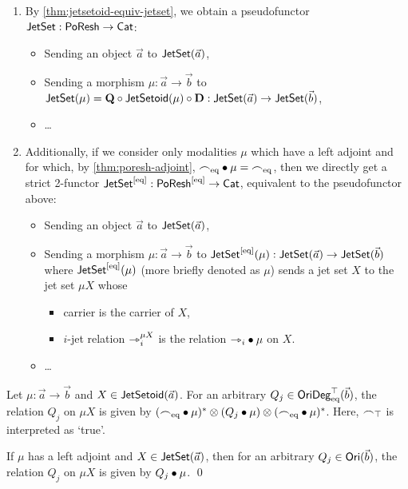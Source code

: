 \documentclass[a4paper]{memoir}
\begin{document}
\begin{definition}
\begin{enumerate}
		\item By \cref{thm:jetsetoid-equiv-jetset}, we obtain a pseudofunctor $\mathsf{JetSet} : \mathsf{PoResh} \to {\mathsf{Cat}}$:
		\begin{itemize}
			\item Sending an object $\vec a$ to $\mathsf{JetSet}(\vec a)$,
			\item Sending a morphism $\mu : \vec a \to \vec b$ to $\mathsf{JetSet}(\mu) = {\mathbf{Q}} \circ \mathsf{JetSetoid}(\mu) \circ {\mathbf{D}} : \mathsf{JetSet}(\vec a) \to \mathsf{JetSet}(\vec b)$,
			\item \ldots
		\end{itemize}
		
		\item Additionally, if we consider only modalities $\mu$ which have a left adjoint and for which, by \cref{thm:poresh-adjoint}, ${\frown}_{{\mathrm{eq}}} \mathbin{\bullet} \mu = {\frown}_{{\mathrm{eq}}}$, then we directly get a strict 2-functor $\mathsf{JetSet} ^{[{\mathrm{eq}}]} : \mathsf{PoResh} ^{[{\mathrm{eq}}]} \to {\mathsf{Cat}}$, equivalent to the pseudofunctor above:
		\begin{itemize}
			\item Sending an object $\vec a$ to $\mathsf{JetSet}(\vec a)$,
			\item Sending a morphism $\mu : \vec a \to \vec b$ to $\mathsf{JetSet}^{[{\mathrm{eq}}]}(\mu) : \mathsf{JetSet}(\vec a) \to \mathsf{JetSet}(\vec b)$ where $\mathsf{JetSet}^{[{\mathrm{eq}}]}(\mu)$ (more briefly denoted as $\mu$) sends a jet set $X$ to the jet set $\mu X$ whose
			\begin{itemize}
				\item carrier is the carrier of $X$,
				\item $i$-jet relation ${\rightarrowtriangle}_i^{\mu X}$ is the relation ${\rightarrowtriangle}_i \mathbin{\bullet} \mu$ on $X$.
			\end{itemize}
			\item \ldots
		\end{itemize}
	\end{enumerate}
\end{definition}
\begin{corollary} \label{thm:poresh-jetsetoid:bind}
	Let $\mu : \vec a \to \vec b$ and $X \in \mathsf{JetSetoid}(\vec a)$.
	For an arbitrary $Q_j \in \mathsf{OriDeg}_{\mathrm{eq}}^\top(\vec b)$, the relation $Q_j$ on $\mu X$ is given by $({\frown}_{{\mathrm{eq}}} \mathbin{\bullet} \mu)^* \otimes (Q_j \mathbin{\bullet} \mu) \otimes ({\frown}_{{\mathrm{eq}}} \mathbin{\bullet} \mu)^*$.
	Here, ${\frown}_\top$ is interpreted as `true'.
	
	If $\mu$ has a left adjoint and $X \in \mathsf{JetSet}(\vec a)$, then for an arbitrary $Q_j \in {\mathsf{Ori}}(\vec b)$, the relation $Q_j$ on $\mu X$ is given by  $Q_j \mathbin{\bullet} \mu$. \qed
\end{corollary}
\end{document}
